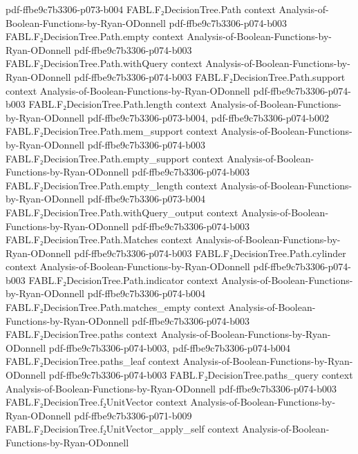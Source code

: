 \begin{theorem}
  {pdf-ffbe9c7b3306-p073-b004}
\proofstep
  {FABL.F₂DecisionTree.Path}
  {context}
  {Analysis-of-Boolean-Functions-by-Ryan-ODonnell}
  {pdf-ffbe9c7b3306-p074-b003}
\proofstep
  {FABL.F₂DecisionTree.Path.empty}
  {context}
  {Analysis-of-Boolean-Functions-by-Ryan-ODonnell}
  {pdf-ffbe9c7b3306-p074-b003}
\proofstep
  {FABL.F₂DecisionTree.Path.withQuery}
  {context}
  {Analysis-of-Boolean-Functions-by-Ryan-ODonnell}
  {pdf-ffbe9c7b3306-p074-b003}
\proofstep
  {FABL.F₂DecisionTree.Path.support}
  {context}
  {Analysis-of-Boolean-Functions-by-Ryan-ODonnell}
  {pdf-ffbe9c7b3306-p074-b003}
\proofstep
  {FABL.F₂DecisionTree.Path.length}
  {context}
  {Analysis-of-Boolean-Functions-by-Ryan-ODonnell}
  {pdf-ffbe9c7b3306-p073-b004,
    pdf-ffbe9c7b3306-p074-b002}
\proofstep
  {FABL.F₂DecisionTree.Path.mem_support}
  {context}
  {Analysis-of-Boolean-Functions-by-Ryan-ODonnell}
  {pdf-ffbe9c7b3306-p074-b003}
\proofstep
  {FABL.F₂DecisionTree.Path.empty_support}
  {context}
  {Analysis-of-Boolean-Functions-by-Ryan-ODonnell}
  {pdf-ffbe9c7b3306-p074-b003}
\proofstep
  {FABL.F₂DecisionTree.Path.empty_length}
  {context}
  {Analysis-of-Boolean-Functions-by-Ryan-ODonnell}
  {pdf-ffbe9c7b3306-p073-b004}
\proofstep
  {FABL.F₂DecisionTree.Path.withQuery_output}
  {context}
  {Analysis-of-Boolean-Functions-by-Ryan-ODonnell}
  {pdf-ffbe9c7b3306-p074-b003}
\proofstep
  {FABL.F₂DecisionTree.Path.Matches}
  {context}
  {Analysis-of-Boolean-Functions-by-Ryan-ODonnell}
  {pdf-ffbe9c7b3306-p074-b003}
\proofstep
  {FABL.F₂DecisionTree.Path.cylinder}
  {context}
  {Analysis-of-Boolean-Functions-by-Ryan-ODonnell}
  {pdf-ffbe9c7b3306-p074-b003}
\proofstep
  {FABL.F₂DecisionTree.Path.indicator}
  {context}
  {Analysis-of-Boolean-Functions-by-Ryan-ODonnell}
  {pdf-ffbe9c7b3306-p074-b004}
\proofstep
  {FABL.F₂DecisionTree.Path.matches_empty}
  {context}
  {Analysis-of-Boolean-Functions-by-Ryan-ODonnell}
  {pdf-ffbe9c7b3306-p074-b003}
\proofstep
  {FABL.F₂DecisionTree.paths}
  {context}
  {Analysis-of-Boolean-Functions-by-Ryan-ODonnell}
  {pdf-ffbe9c7b3306-p074-b003,
    pdf-ffbe9c7b3306-p074-b004}
\proofstep
  {FABL.F₂DecisionTree.paths_leaf}
  {context}
  {Analysis-of-Boolean-Functions-by-Ryan-ODonnell}
  {pdf-ffbe9c7b3306-p074-b003}
\proofstep
  {FABL.F₂DecisionTree.paths_query}
  {context}
  {Analysis-of-Boolean-Functions-by-Ryan-ODonnell}
  {pdf-ffbe9c7b3306-p074-b003}
\proofstep
  {FABL.F₂DecisionTree.f₂UnitVector}
  {context}
  {Analysis-of-Boolean-Functions-by-Ryan-ODonnell}
  {pdf-ffbe9c7b3306-p071-b009}
\proofstep
  {FABL.F₂DecisionTree.f₂UnitVector_apply_self}
  {context}
  {Analysis-of-Boolean-Functions-by-Ryan-ODonnell}

\end{theorem}
